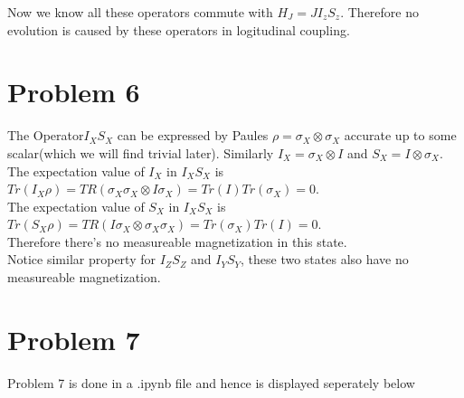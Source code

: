 \documentclass[11pt]{article}
\begin{document}
Now we know all these operators commute with $H_J = JI_zS_z$. Therefore no evolution is caused by these operators in logitudinal coupling.

\section*{Problem 6}

The Operator$I_XS_X$ can be expressed by Paules $\rho = \sigma_X \otimes \sigma_X$ accurate up to some scalar(which we will find trivial later). Similarly $I_X=\sigma_X \otimes I$ and $S_X = I \otimes \sigma_X$. \\

The expectation value of $I_X$ in $I_XS_X$ is $Tr(I_X \rho) = TR(\sigma_X\sigma_X \otimes I \sigma_X) = Tr(I)Tr(\sigma_X) = 0$.\\
 The expectation value of $S_X$ in $I_XS_X$ is $Tr(S_X \rho) = TR(I\sigma_X \otimes \sigma_X \sigma_X) = Tr(\sigma_X)Tr(I) = 0$.\\
Therefore there's no measureable magnetization in this state.\\
Notice similar property for $I_ZS_Z$ and $I_YS_Y$, these two states also have no measureable magnetization.\\

\section*{Problem 7}

Problem 7 is done in a .ipynb file and hence is displayed seperately below

    

\end{document}

